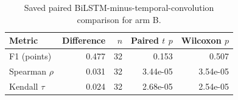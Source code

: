 \begin{table}[ht]
\centering
\caption{Saved paired BiLSTM-minus-temporal-convolution comparison for arm B.}
\label{tab:bilstm}
\begin{tabular}{lrrrr}
\toprule
Metric & Difference & $n$ & Paired $t$ $p$ & Wilcoxon $p$ \\
\midrule
F1 (points) & 0.477 & 32 & 0.153 & 0.507 \\
Spearman $\rho$ & 0.031 & 32 & 3.44e-05 & 3.54e-05 \\
Kendall $\tau$ & 0.024 & 32 & 2.68e-05 & 2.54e-05 \\
\bottomrule
\end{tabular}
\end{table}

